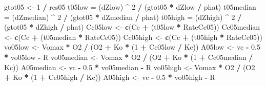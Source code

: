 \documentclass[
]{krantz}
\makeatletter
\newenvironment{Shaded}{\begin{snugshade}}{\end{snugshade}}
\newcommand{\DecValTok}[1]{\textcolor[rgb]{0.00,0.00,0.81}{#1}}
\newcommand{\FloatTok}[1]{\textcolor[rgb]{0.00,0.00,0.81}{#1}}
\newcommand{\KeywordTok}[1]{\textcolor[rgb]{0.13,0.29,0.53}{\textbf{#1}}}
\newcommand{\NormalTok}[1]{#1}
\newcommand{\OperatorTok}[1]{\textcolor[rgb]{0.81,0.36,0.00}{\textbf{#1}}}
\newcommand{\StringTok}[1]{\textcolor[rgb]{0.31,0.60,0.02}{#1}}
\newenvironment{kframe}{%
\medskip{}
\setlength{\fboxsep}{.8em}
 \def\at@end@of@kframe{}%
 \ifinner\ifhmode%
  \def\at@end@of@kframe{\end{minipage}}%
  \begin{minipage}{\columnwidth}%
 \fi\fi%
 \def\FrameCommand##1{\hskip\@totalleftmargin \hskip-\fboxsep
 \colorbox{shadecolor}{##1}\hskip-\fboxsep
     \hskip-\linewidth \hskip-\@totalleftmargin \hskip\columnwidth}%
 \MakeFramed {\advance\hsize-\width
   \@totalleftmargin\z@ \linewidth\hsize
   \@setminipage}}%
 {\par\unskip\endMakeFramed%
 \at@end@of@kframe}
\renewenvironment{Shaded}{\begin{kframe}}{\end{kframe}}
\makeatother
\begin{document}
\begin{Shaded}
\begin{Highlighting}[]
\NormalTok{gtot05 <-}\StringTok{ }\DecValTok{1} \OperatorTok{/}\StringTok{ }\NormalTok{res05}
\NormalTok{t05low =}\StringTok{ }\NormalTok{(dZlow) }\OperatorTok{^}\StringTok{ }\DecValTok{2} \OperatorTok{/}\StringTok{ }\NormalTok{(gtot05 }\OperatorTok{*}\StringTok{ }\NormalTok{dZlow }\OperatorTok{/}\StringTok{ }\NormalTok{phat)}
\NormalTok{t05median =}\StringTok{ }\NormalTok{(dZmedian) }\OperatorTok{^}\StringTok{ }\DecValTok{2} \OperatorTok{/}\StringTok{ }\NormalTok{(gtot05 }\OperatorTok{*}\StringTok{ }\NormalTok{dZmedian }\OperatorTok{/}\StringTok{ }\NormalTok{phat)}
\NormalTok{t05high =}\StringTok{ }\NormalTok{(dZhigh) }\OperatorTok{^}\StringTok{ }\DecValTok{2} \OperatorTok{/}\StringTok{ }\NormalTok{(gtot05 }\OperatorTok{*}\StringTok{ }\NormalTok{dZhigh }\OperatorTok{/}\StringTok{ }\NormalTok{phat)}
\NormalTok{Cc05low <-}\StringTok{ }\KeywordTok{c}\NormalTok{(Cc }\OperatorTok{+}\StringTok{ }\NormalTok{(t05low }\OperatorTok{*}\StringTok{ }\NormalTok{RateCc05))}
\NormalTok{Cc05median <-}\StringTok{ }\KeywordTok{c}\NormalTok{(Cc }\OperatorTok{+}\StringTok{ }\NormalTok{(t05median }\OperatorTok{*}\StringTok{ }\NormalTok{RateCc05))}
\NormalTok{Cc05high <-}\StringTok{ }\KeywordTok{c}\NormalTok{(Cc }\OperatorTok{+}\StringTok{ }\NormalTok{(t05high }\OperatorTok{*}\StringTok{ }\NormalTok{RateCc05))}
\NormalTok{vo05low <-}\StringTok{ }\NormalTok{Vomax }\OperatorTok{*}\StringTok{ }\NormalTok{O2 }\OperatorTok{/}\StringTok{ }\NormalTok{(O2 }\OperatorTok{+}\StringTok{ }\NormalTok{Ko }\OperatorTok{*}\StringTok{ }\NormalTok{(}\DecValTok{1} \OperatorTok{+}\StringTok{ }\NormalTok{Cc05low }\OperatorTok{/}\StringTok{ }\NormalTok{Kc)) }
\NormalTok{A05low <-}\StringTok{ }\NormalTok{vc }\OperatorTok{-}\StringTok{ }\FloatTok{0.5} \OperatorTok{*}\StringTok{ }\NormalTok{vo05low }\OperatorTok{-}\StringTok{ }\NormalTok{R }
\NormalTok{vo05median <-}\StringTok{ }\NormalTok{Vomax }\OperatorTok{*}\StringTok{ }\NormalTok{O2 }\OperatorTok{/}\StringTok{ }\NormalTok{(O2 }\OperatorTok{+}\StringTok{ }\NormalTok{Ko }\OperatorTok{*}\StringTok{ }\NormalTok{(}\DecValTok{1} \OperatorTok{+}\StringTok{ }\NormalTok{Cc05median }\OperatorTok{/}\StringTok{ }\NormalTok{Kc)) }
\NormalTok{A05median <-}\StringTok{ }\NormalTok{vc }\OperatorTok{-}\StringTok{ }\FloatTok{0.5} \OperatorTok{*}\StringTok{ }\NormalTok{vo05median }\OperatorTok{-}\StringTok{ }\NormalTok{R }
\NormalTok{vo05high <-}\StringTok{ }\NormalTok{Vomax }\OperatorTok{*}\StringTok{ }\NormalTok{O2 }\OperatorTok{/}\StringTok{ }\NormalTok{(O2 }\OperatorTok{+}\StringTok{ }\NormalTok{Ko }\OperatorTok{*}\StringTok{ }\NormalTok{(}\DecValTok{1} \OperatorTok{+}\StringTok{ }\NormalTok{Cc05high }\OperatorTok{/}\StringTok{ }\NormalTok{Kc)) }
\NormalTok{A05high <-}\StringTok{ }\NormalTok{vc }\OperatorTok{-}\StringTok{ }\FloatTok{0.5} \OperatorTok{*}\StringTok{ }\NormalTok{vo05high }\OperatorTok{-}\StringTok{ }\NormalTok{R }


\end{Highlighting}
\end{Shaded}
\end{document}
